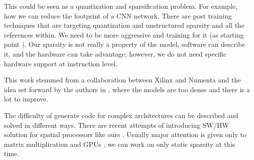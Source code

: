 \documentclass{IEEEtran}
\begin{document}
This could be seen as a quantization and sparsification problem. For
example, how we can reduce the footprint of a CNN network. There are
post training techniques that are targeting quantization and
unstructured sparsity \cite{frantar2023gptq} and all the references
within. We need to be more aggressive and training for it (as starting
point \cite{abs-2102-11289}).  Our sparsity is not really a property
of the model, software can describe it, and the hardware can take
advantage; however, we do not need specific hardware support at
instruction level.

This work stemmed from a collaboration between Xilinx and Numenta and
the idea set forward by the authors in \cite{ahmad2019dense}, where
the models are too dense and there is a lot to improve.


The difficulty of generate code for complex architectures can be
described and solved in different ways. There are recent attempts of
introducing SW/HW solution for spatial processors like ours
\cite{Huang2021CoSASB,Russo2023MemoryAwareDA,Cai2023InterlayerSS}.
Usually major attention is given only to matrix multiplication and
GPUs \cite{Gray2017GPUKF} \cite{li2023popsparse}, we can work on only static
sparsity at this time.










\end{document}
